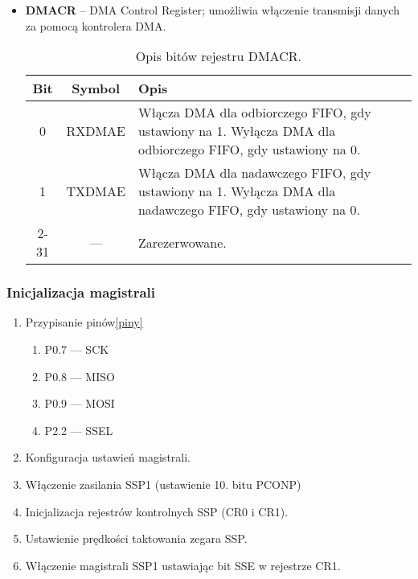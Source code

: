 \begin{itemize}
  \item \textbf{DMACR} – DMA Control Register; umożliwia włączenie transmisji danych za pomocą kontrolera DMA.

\begin{table}[H]
\centering
\caption{Opis bitów rejestru DMACR.}
\vspace{0.5em}
\renewcommand{\arraystretch}{1.2}
\begin{tabular}{|c|c|p{10cm}|}
\hline
\textbf{Bit} & \textbf{Symbol} & \textbf{Opis} \\
\hline
0 & RXDMAE & Włącza DMA dla odbiorczego FIFO, gdy ustawiony na 1. Wyłącza DMA dla odbiorczego FIFO, gdy ustawiony na 0. \\
\hline
1 & TXDMAE & Włącza DMA dla nadawczego FIFO, gdy ustawiony na 1. Wyłącza DMA dla nadawczego FIFO, gdy ustawiony na 0. \\
\hline
2-31 & — & Zarezerwowane. \\
\hline
\end{tabular}
\end{table}

  
\end{itemize}

\subsubsection{Inicjalizacja magistrali}
\begin{enumerate}
    \item Przypisanie pinów\ref{piny}
    \begin{enumerate}
        \item P0.7 — SCK
        \item P0.8 — MISO
        \item P0.9 — MOSI
        \item P2.2 — SSEL
    \end{enumerate}
    \item Konfiguracja ustawień magistrali.
    \item Włączenie zasilania SSP1 (ustawienie 10. bitu PCONP)
    \item Inicjalizacja rejestrów kontrolnych SSP (CR0 i CR1).
    \item Ustawienie prędkości taktowania zegara SSP.
    \item Włączenie magistrali SSP1 ustawiając bit SSE w rejestrze CR1.
\end{enumerate}

